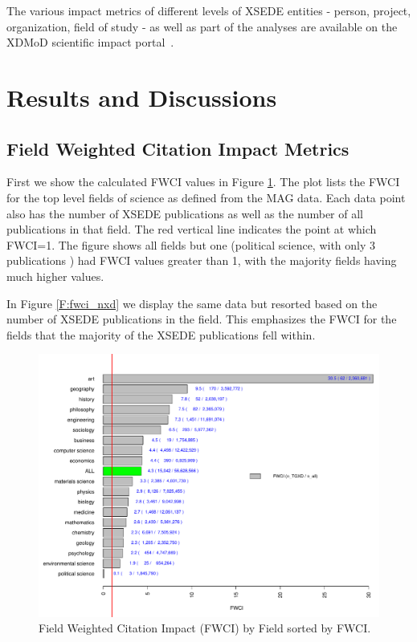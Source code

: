 \documentclass{sig-alternate}
\begin{document}
The various impact metrics of different levels of XSEDE entities -
person, project, organization, field of study - as well as part of the
analyses are available on the XDMoD scientific impact
portal~\cite{www-xdmod-sciimp}.

\section{Results and Discussions} \label{S:result}

\subsection{Field Weighted Citation Impact Metrics}

First we show the calculated FWCI values in Figure
\ref{F:fwci_fwci}. The plot lists the FWCI for the top level fields of
science as defined from the MAG data.  Each data point also has the
number of XSEDE publications as well as the number of all publications
in that field. The red vertical line indicates the point at which
FWCI=1. The figure shows all fields but one (political science, with
only 3 publications ) had FWCI values greater than 1, with the
majority fields having much higher values.

In Figure \ref{F:fwci_nxd} we display the same data but resorted based
on the number of XSEDE publications in the field. This emphasizes the
FWCI for the fields that the majority of the XSEDE publications fell
within.

\begin{figure}[htb!]
    \includegraphics[width=0.95\columnwidth]{images/fwci_fwci.pdf}
    \caption{Field Weighted Citation Impact (FWCI) by Field sorted by FWCI.}
    \label{F:fwci_fwci}
\end{figure}
\end{document}
